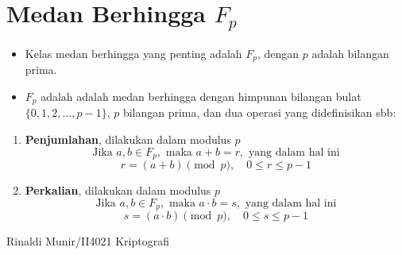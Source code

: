 \documentclass{article}
\begin{document}

\section*{Medan Berhingga $F_p$}

\begin{itemize}
    \item Kelas medan berhingga yang penting adalah $F_p$, dengan $p$ adalah bilangan prima.
    \item $F_p$ adalah adalah medan berhingga dengan himpunan bilangan bulat $\{0, 1, 2, \dots, p-1\}$, $p$ bilangan prima, dan dua operasi yang didefinisikan sbb:
\end{itemize}

\begin{enumerate}
    \item \textbf{Penjumlahan}, dilakukan dalam modulus $p$
    \[
    \text{Jika } a, b \in F_p, \text{ maka } a + b = r, \text{ yang dalam hal ini}
    \]
    \[
    r = (a + b) \pmod p, \quad 0 \le r \le p - 1
    \]
    \item \textbf{Perkalian}, dilakukan dalam modulus $p$
    \[
    \text{Jika } a, b \in F_p, \text{ maka } a \cdot b = s, \text{ yang dalam hal ini}
    \]
    \[
    s = (a \cdot b) \pmod p, \quad 0 \le s \le p - 1
    \]
\end{enumerate}

\vfill
\begin{center}
    Rinaldi Munir/II4021 Kriptografi
\end{center}
\end{document}
